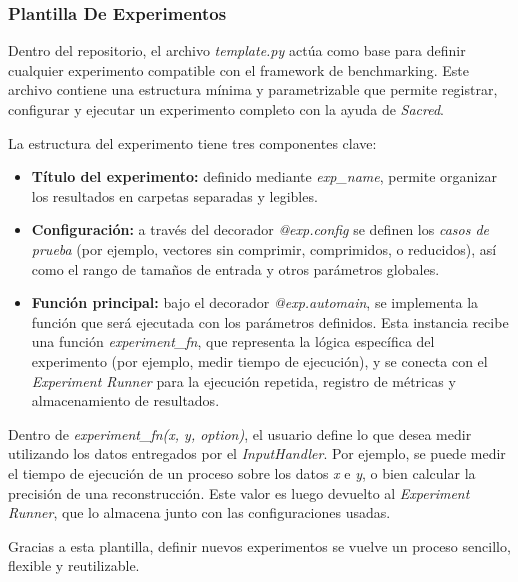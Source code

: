 \subsubsection{Plantilla De Experimentos}

Dentro del repositorio, el archivo \textit{template.py} actúa como base para definir cualquier experimento compatible con el framework de benchmarking. Este archivo contiene una estructura mínima y parametrizable que permite registrar, configurar y ejecutar un experimento completo con la ayuda de \textit{Sacred}.

La estructura del experimento tiene tres componentes clave:

\begin{itemize}
    \item \textbf{Título del experimento:} definido mediante \textit{exp\_name}, permite organizar los resultados en carpetas separadas y legibles.
    \item \textbf{Configuración:} a través del decorador \textit{@exp.config} se definen los \textit{casos de prueba} (por ejemplo, vectores sin comprimir, comprimidos, o reducidos), así como el rango de tamaños de entrada y otros parámetros globales.
    \item \textbf{Función principal:} bajo el decorador \textit{@exp.automain}, se implementa la función que será ejecutada con los parámetros definidos. Esta instancia recibe una función \textit{experiment\_fn}, que representa la lógica específica del experimento (por ejemplo, medir tiempo de ejecución), y se conecta con el \textit{Experiment Runner} para la ejecución repetida, registro de métricas y almacenamiento de resultados.
\end{itemize}

Dentro de \textit{experiment\_fn(x, y, option)}, el usuario define lo que desea medir utilizando los datos entregados por el \textit{InputHandler}. Por ejemplo, se puede medir el tiempo de ejecución de un proceso sobre los datos \textit{x} e \textit{y}, o bien calcular la precisión de una reconstrucción. Este valor es luego devuelto al \textit{Experiment Runner}, que lo almacena junto con las configuraciones usadas.

Gracias a esta plantilla, definir nuevos experimentos se vuelve un proceso sencillo, flexible y reutilizable.